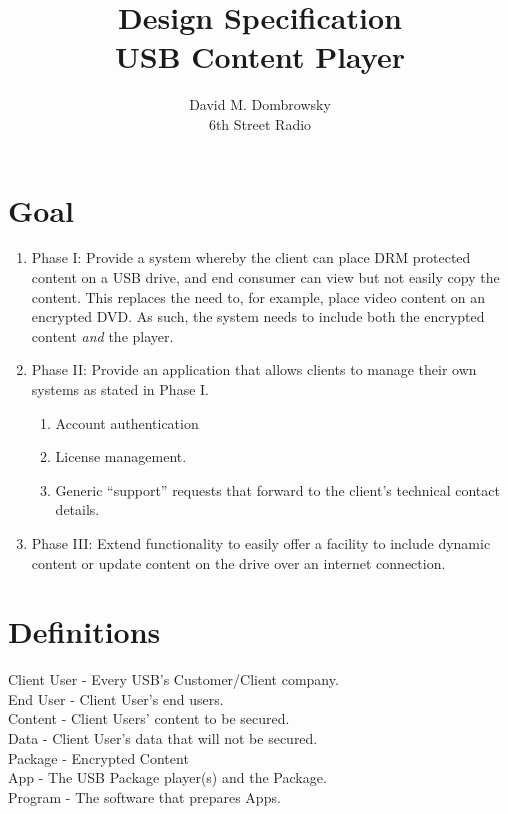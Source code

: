 \documentclass{article}
\title{Design Specification \\ USB Content Player}
\author{David M. Dombrowsky \\ 6th Street Radio}
\begin{document}
\maketitle

\section{Goal}

\begin{enumerate}

\item Phase I: Provide a system whereby the client can place DRM
protected content on a USB drive, and end consumer can view but not
easily copy the content.  This replaces the need to, for example,
place video content on an encrypted DVD.  As such, the system needs to
include both the encrypted content {\it and} the player.

\item Phase II: Provide an application that allows clients to manage
their own systems as stated in Phase I.
    \begin{enumerate}
    \item Account authentication
    \item License management.
    \item Generic “support” requests that forward to the client’s 
          technical contact details.
    \end{enumerate}

\item Phase III: Extend functionality to easily offer a facility to
include dynamic content or update content on the drive over an
internet connection.

\end{enumerate}
\newpage
\tableofcontents
\listoffigures
\newpage

\section{Definitions}
Client User - Every USB's Customer/Client company.\\
End User - Client User's end users.\\
Content - Client Users' content to be secured.\\
Data - Client User's data that will not be secured.\\
Package - Encrypted Content\\
App - The USB Package player(s) and the Package.\\
Program - The software that prepares Apps.\\
\end{document}
